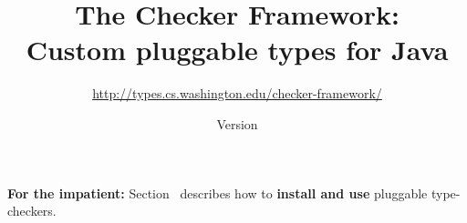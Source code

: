 \documentclass[10pt]{report}
\title{The Checker Framework: \\ Custom pluggable types for Java}
\author{%
\url{http://types.cs.washington.edu/checker-framework/}}
\date{Version \ReleaseInfo{}}
\begin{document}
\maketitle



\setcounter{page}{2}

\newcommand{\ahreforurl}[2]{#2 (\url{#1})}


\noindent
\textbf{For the impatient:}
Section~
describes how to \textbf{install and use} pluggable type-checkers.

%


\tableofcontents
\newpage
















% 















\htmlhr


\end{document}
